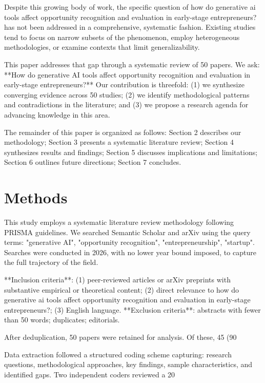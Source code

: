 \documentclass[11pt, a4paper]{article}
\begin{document}
Despite this growing body of work, the specific question of how do generative ai tools affect opportunity recognition and evaluation in early-stage entrepreneurs? has not been addressed in a comprehensive, systematic fashion. Existing studies tend to focus on narrow subsets of the phenomenon, employ heterogeneous methodologies, or examine contexts that limit generalizability.

This paper addresses that gap through a systematic review of 50 papers. We ask: **How do generative AI tools affect opportunity recognition and evaluation in early-stage entrepreneurs?** Our contribution is threefold: (1) we synthesize converging evidence across 50 studies; (2) we identify methodological patterns and contradictions in the literature; and (3) we propose a research agenda for advancing knowledge in this area.

The remainder of this paper is organized as follows: Section 2 describes our methodology; Section 3 presents a systematic literature review; Section 4 synthesizes results and findings; Section 5 discusses implications and limitations; Section 6 outlines future directions; Section 7 concludes.

\section{Methods}
This study employs a systematic literature review methodology following PRISMA guidelines. We searched Semantic Scholar and arXiv using the query terms: "generative AI", "opportunity recognition", "entrepreneurship", "startup". Searches were conducted in 2026, with no lower year bound imposed, to capture the full trajectory of the field.

**Inclusion criteria**: (1) peer-reviewed articles or arXiv preprints with substantive empirical or theoretical content; (2) direct relevance to how do generative ai tools affect opportunity recognition and evaluation in early-stage entrepreneurs?; (3) English language. **Exclusion criteria**: abstracts with fewer than 50 words; duplicates; editorials.

After deduplication, 50 papers were retained for analysis. Of these, 45 (90%

Data extraction followed a structured coding scheme capturing: research questions, methodological approaches, key findings, sample characteristics, and identified gaps. Two independent coders reviewed a 20%
\end{document}
